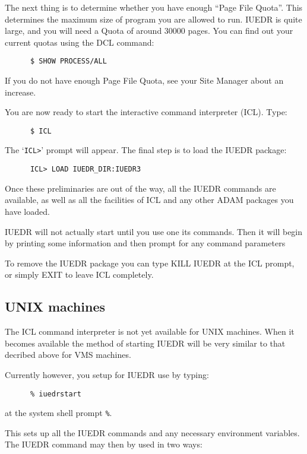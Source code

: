 The next thing is to determine whether you have enough ``Page File
Quota''. This determines the maximum size of program you are allowed
to run. IUEDR is quite large, and you will need a Quota of around
30000 pages. You can find out your current quotas using the DCL
command:

\begin{verbatim}
      $ SHOW PROCESS/ALL
\end{verbatim}

If you do not have enough Page File Quota, see your Site Manager about
an increase.

You are now ready to start the interactive command interpreter (ICL). 
Type:

\begin{verbatim}
      $ ICL
\end{verbatim}

The `\verb+ICL>+' prompt will appear. The final step is to load the IUEDR
package:

\begin{verbatim}
      ICL> LOAD IUEDR_DIR:IUEDR3
\end{verbatim}

Once these preliminaries are out of the way, all the IUEDR commands
are available, as well as all the facilities of ICL and any other ADAM
packages you have loaded.

IUEDR will not actually start until you use one its commands. Then it
will begin by printing some information and then prompt for any
command parameters

To remove the IUEDR package you can type  KILL IUEDR at the ICL
prompt,  or simply EXIT to leave ICL completely.

\subsection{UNIX machines}

The ICL command interpreter is not yet available for UNIX machines.
When it becomes available the method of starting IUEDR will be very
similar to that decribed above for VMS machines.

Currently however, you setup for IUEDR use by typing:

\begin{verbatim}
      % iuedrstart
\end{verbatim}
at the system shell prompt {\tt \%}.

This sets up all the IUEDR commands and any necessary environment
variables. The IUEDR command may then by used in two ways:


